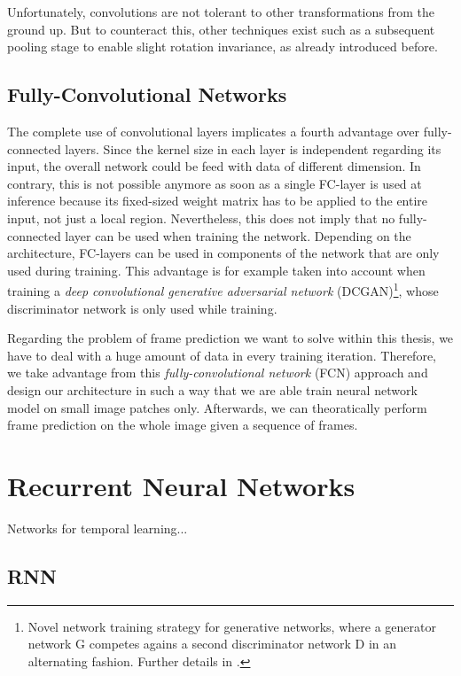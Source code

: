 Unfortunately, convolutions are not tolerant to other transformations from the ground up. But to counteract this, other techniques exist such as a subsequent pooling stage to enable slight rotation invariance, as already introduced before.


\subsection{Fully-Convolutional Networks}

The complete use of convolutional layers implicates a fourth advantage over fully-connected layers. Since the kernel size in each layer is independent regarding its input, the overall network could be feed with data of different dimension. In contrary, this is not possible anymore as soon as a single FC-layer is used at inference because its fixed-sized weight matrix has to be applied to the entire input, not just a local region. Nevertheless, this does not imply that no fully-connected layer can be used when training the network. Depending on the architecture, FC-layers can be used in components of the network that are only used during training. This advantage is for example taken into account when training a \textit{deep convolutional generative adversarial network} (DCGAN)\footnote{Novel network training strategy for generative networks, where a generator network G competes agains a second discriminator network D in an alternating fashion. Further details in \parencite{gan}.}, whose discriminator network is only used while training.

Regarding the problem of frame prediction we want to solve within this thesis, we have to deal with a huge amount of data in every training iteration. Therefore, we take advantage from this \textit{fully-convolutional network} (FCN) approach and design our architecture in such a way that we are able train neural network model on small image patches only. Afterwards, we can theoratically perform frame prediction on the whole image given a sequence of frames.


\section{Recurrent Neural Networks}

Networks for temporal learning...

\subsection{RNN}

